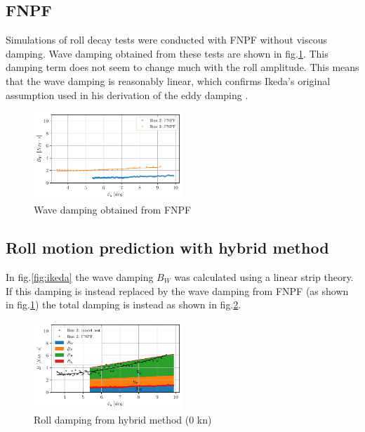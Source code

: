     \subsection{FNPF}\label{fnpf}

Simulations of roll decay tests were conducted with FNPF without viscous
damping. Wave damping obtained from these tests are shown in
fig.\ref{fig:fnpf}. This damping term does not seem to change
much with the roll amplitude. This means that the wave damping is
reasonably linear, which confirms Ikeda's original assumption used in
his derivation of the eddy damping \cite{7505983/4AFVVGNT}.

    

    \begin{figure}[H]
        \begin{center}\includegraphics[width = 0.5\textwidth]{figures/fnpf.pdf}\end{center}
        \vspace{-1cm}
        \caption{Wave damping obtained from FNPF}
        \label{fig:fnpf}
    \end{figure}
    
    \subsection{Roll motion prediction with hybrid
method}\label{roll-motion-prediction-with-hybrid-method}

    In fig.\ref{fig:ikeda} the wave damping $B_W$ was calculated
using a linear strip theory. If this damping is instead replaced by the
wave damping from FNPF (as shown in fig.\ref{fig:fnpf}) the
total damping is instead as shown in fig.\ref{fig:hybrid_0}.

    

    \begin{figure}[H]
        \begin{center}\includegraphics[width = 0.5\textwidth]{figures/hybrid_0.pdf}\end{center}
        \vspace{-1cm}
        \caption{Roll damping from hybrid method (0 kn)}
        \label{fig:hybrid_0}
    \end{figure}
    
